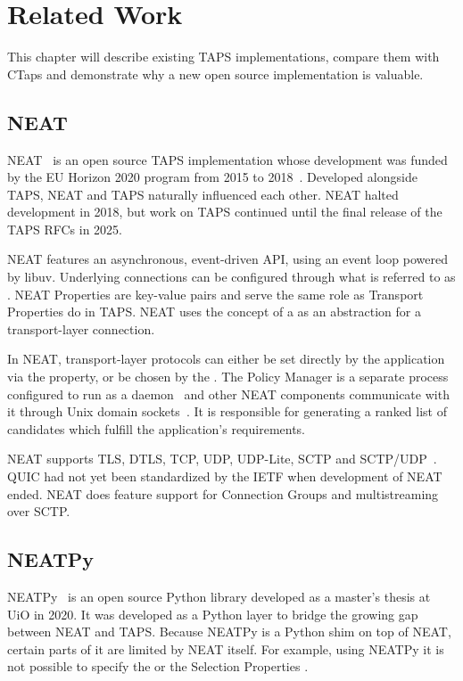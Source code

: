 \chapter{Related Work}\label{chap:related-work}
This chapter will describe existing TAPS implementations, compare them with CTaps
and demonstrate why a new open source implementation
is valuable.

\section{NEAT}
NEAT~\cite{khademiNEATPlatformProtocolIndependent2017}
is an open source \cite{neatCode} TAPS implementation whose development was funded by the EU Horizon 2020 program 
from 2015 to 2018~\cite{neatFunding}.
Developed alongside TAPS, NEAT and TAPS naturally
influenced each other. NEAT halted development in 2018, but work on
TAPS continued until the final release of the TAPS RFCs in 2025.

NEAT features an asynchronous, event-driven API, using an event loop
powered by libuv. Underlying connections
can be configured through what is referred to as .
NEAT Properties are key-value pairs and serve the same role as Transport Properties
do in TAPS. NEAT uses the concept of a 
as an abstraction for a transport-layer connection.

In NEAT, transport-layer protocols can either be set directly by the application
via the  property, or be chosen by the .
The Policy Manager is a separate process configured
to run as a daemon~\cite[p.~81]{neat-d23} and other NEAT components communicate with it through Unix domain
sockets~\cite[p.~72]{neat-d23}. It is responsible for
generating a ranked list of candidates which fulfill the application's requirements. 

NEAT supports TLS, DTLS, TCP, UDP, UDP-Lite, SCTP and SCTP/UDP~\cite[p.~92]{neat-d23}.
QUIC had not yet been standardized by the IETF when development
of NEAT ended. NEAT does feature support for Connection Groups
and multistreaming over SCTP.


\section{NEATPy}
NEATPy~\cite{gundersenNEATPyStandardsConformantProtocolIndependent2020}
is an open source Python library developed as a master's thesis at UiO in 2020.
It was developed as a
Python layer to bridge the growing gap between NEAT and TAPS.
Because NEATPy is a Python shim on top of NEAT, certain parts of it are
limited by NEAT itself. For example,
using NEATPy it is not possible to specify the 
or the  Selection Properties 
\cite{NEATPyDocumentationNEATPy}.

